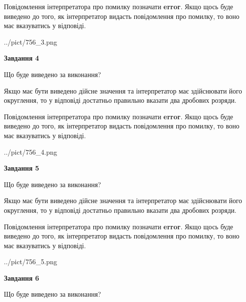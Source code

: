 \documentclass[12pt, ukrainian]{article}
\begin{document}
{\begin {Large}
Повідомлення інтерпретатора про помилку позначати \textbf{error}.
Якщо щось буде виведено до того, як інтерпретатор видасть повідомлення про помилку, 
то воно має вказуватись у відповіді. \par

\begin{center}
	{../pict/756_3.png}
\end{center}
\newpage

{\begin {center}\textbf{Завдання 4}\end {center}}\par
Що буде виведено за виконання? \par

Якщо має бути виведено дійсне значення та інтерпретатор має здійснювати його округлення, 
то у відповіді достатньо правильно вказати два дробових розряди.

Повідомлення інтерпретатора про помилку позначати \textbf{error}.
Якщо щось буде виведено до того, як інтерпретатор видасть повідомлення про помилку, 
то воно має вказуватись у відповіді. \par

\begin{center}
	{../pict/756_4.png}
\end{center}
\newpage

{\begin {center}\textbf{Завдання 5}\end {center}}\par
Що буде виведено за виконання? \par

Якщо має бути виведено дійсне значення та інтерпретатор має здійснювати його округлення, 
то у відповіді достатньо правильно вказати два дробових розряди.

Повідомлення інтерпретатора про помилку позначати \textbf{error}.
Якщо щось буде виведено до того, як інтерпретатор видасть повідомлення про помилку, 
то воно має вказуватись у відповіді. \par

\begin{center}
	{../pict/756_5.png}
\end{center}
\newpage

{\begin {center}\textbf{Завдання 6}\end {center}}\par
Що буде виведено за виконання? \par


\end{Large}}
\end{document}
